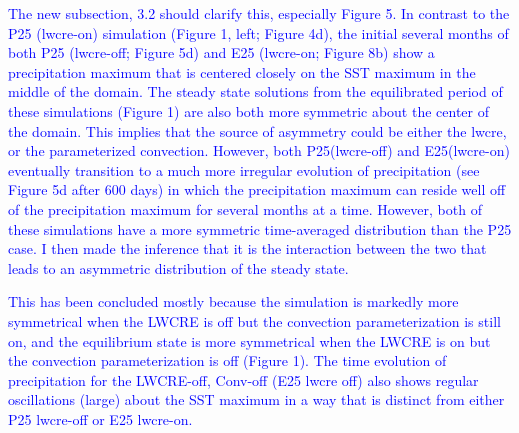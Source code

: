 \documentclass[draft]{agujournal2019}
\begin{document}
\begin{itemize}
  \textcolor{blue}{The new subsection, 3.2 should clarify this, especially Figure 5. In contrast to the P25 (lwcre-on) simulation (Figure 1, left; Figure 4d), the initial several months of both P25 
  (lwcre-off; Figure 5d) and E25 (lwcre-on; Figure 8b) show a precipitation maximum that is centered closely on the SST 
  maximum in the middle of the domain.  The steady state solutions from the equilibrated period of these simulations (Figure 1) are 
  also both more symmetric about the center of the domain.  This implies that the source of asymmetry could be either the lwcre, 
  or the parameterized convection.  However, both P25(lwcre-off) and E25(lwcre-on) eventually transition to a much more irregular evolution of precipitation (see Figure 5d after 600 days) in which the precipitation maximum can reside well off of the 
  precipitation maximum for several months at a time.  However, both of these simulations have a more symmetric time-averaged distribution than the P25 case.  I then made the inference that it is the interaction between the two that leads to an asymmetric distribution of the steady state. }

\textcolor{blue}{
This has been concluded mostly because the simulation is markedly more symmetrical when the LWCRE is off but the convection parameterization is still on, and the equilibrium state is more symmetrical when the LWCRE is on but the convection parameterization is off (Figure 1).  The time evolution of precipitation for the LWCRE-off, Conv-off (E25 lwcre off) also shows regular oscillations (large) about the SST maximum in a way that is distinct from either P25 lwcre-off or E25 lwcre-on. } 


\end{itemize}
\end{document}
